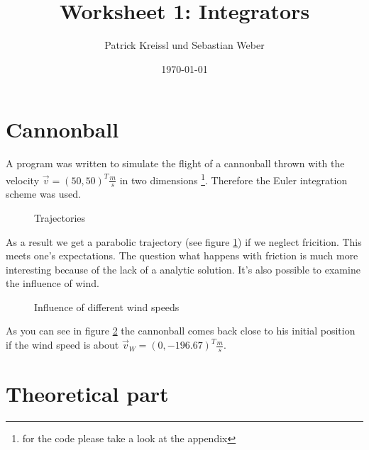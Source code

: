 \documentclass[12pt,a4paper]{scrartcl}
\author{Patrick Kreissl und Sebastian Weber}
\title{Worksheet 1: Integrators}
\date{\today}
\begin{document}
\renewcommand{\tablename}{Tab.}

\maketitle

\tableofcontents

\newpage
\section{Cannonball}

A program was written to simulate the flight of a cannonball thrown with the velocity $\vec{v} = (50, 50)^T \tfrac{m}{s}$ in two dimensions \footnote{for the code please take a look at the  appendix}. Therefore the Euler integration scheme was used.

\begin{figure}[H]
	\resizebox{1\textwidth}{!}{}
	\caption{Trajectories}\label{fig:c1}
\end{figure}

As a result we get a parabolic trajectory (see figure \ref{fig:c1}) if we neglect fricition. This meets one's expectations. The question what happens with friction is much more interesting because of the lack of a analytic solution. It's also possible to examine the influence of wind. 

\begin{figure}[H]
	\resizebox{1\textwidth}{!}{}
	\caption{Influence of different wind speeds}\label{fig:c2}
\end{figure}

As you can see in figure \ref{fig:c2} the cannonball comes back close to his initial position if the wind speed is about $\vec{v}_W = (0, -196.67)^T \tfrac{m}{s}$.

\section{Theoretical part \label{theo}}
\end{document}
